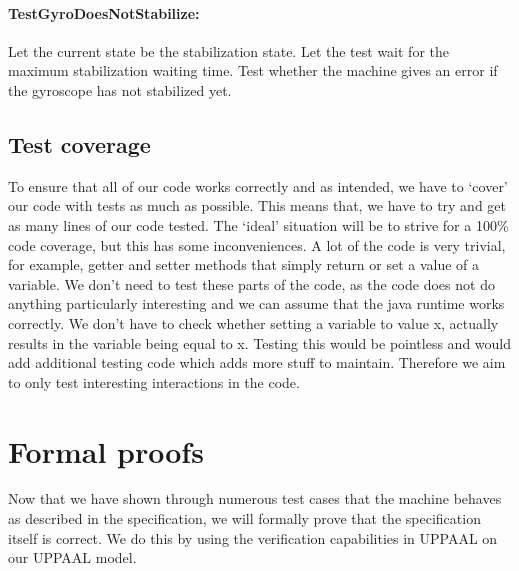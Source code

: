 \documentclass[a4paper,oneside,11pt]{article}
\begin{document}
\paragraph{TestGyroDoesNotStabilize:}
Let the current state be the stabilization state. Let the test wait for the maximum stabilization waiting time. Test whether the machine gives an error if the gyroscope has not stabilized yet.

\subsection{Test coverage}
To ensure that all of our code works correctly and as intended, we have to ‘cover’ our code with tests as much as possible. This means that, we have to try and get as many lines of our code tested. The ‘ideal’ situation will be to strive for a 100\% code coverage, but this has some inconveniences. A lot of the code is very trivial, for example, getter and setter methods that simply return or set a value of a variable. We don’t need to test these parts of the code, as the code does not do anything particularly interesting and we can assume that the java runtime works correctly. We don’t have to check whether setting a variable to value x, actually results in the variable being equal to x. Testing this would be pointless and would add additional testing code which adds more stuff to maintain. Therefore we aim to only test interesting interactions in the code.

\section{Formal proofs}
Now that we have shown through numerous test cases that the machine behaves as described in the specification, we will formally prove that the specification itself is correct. We do this by using the verification capabilities in UPPAAL on our UPPAAL model.
\end{document}
